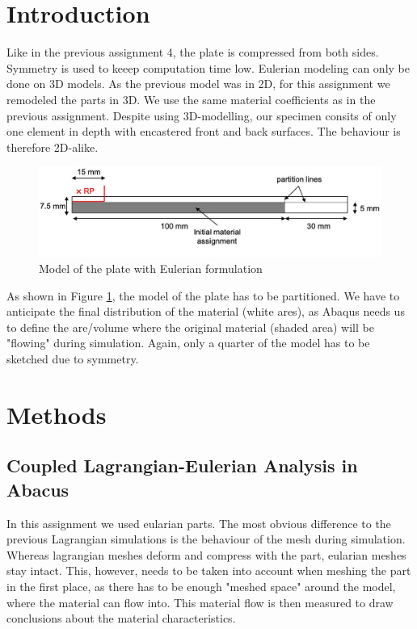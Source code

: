 \documentclass[12pt]{article}
\begin{document}
\section{Introduction}
Like in the previous assignment 4, the plate is compressed from both sides. Symmetry is used to keeep
computation time low. 
Eulerian modeling can only be done on 3D models. As the previous model was in 2D, 
for this assignment we remodeled the parts in 3D. We use the same material coefficients
as in the previous assignment. 
Despite using 3D-modelling, our specimen consits of only one element in depth
with encastered front and back surfaces. The behaviour is therefore
2D-alike.

\begin{figure}[!htb]
  \centering
  \includegraphics[width=1.0\linewidth]{pics/shematics}
  \caption{Model of the plate with Eulerian formulation}
  \label{fig:1}
\end{figure}

\noindent As shown in Figure \ref{fig:1}, the model of the plate has to be partitioned. 
We have to anticipate the final distribution of the material (white ares), as Abaqus needs us to define the are/volume 
where the original material (shaded area) will be "flowing" during simulation. 
Again, only a quarter of the model has to be sketched due to symmetry.

\newpage
\section{Methods}

\subsection{Coupled Lagrangian-Eulerian Analysis in Abacus}

In this assignment we used eularian parts. The most obvious difference to the previous Lagrangian
simulations is the behaviour of the mesh during simulation. Whereas lagrangian meshes deform and compress 
with the part, eularian meshes stay intact. This, however, needs to be taken into account 
when meshing the part in the first place, as there has to be enough "meshed space" around the model,
where the material can flow into. This material flow is then measured to draw conclusions
about the material characteristics.
\end{document}
